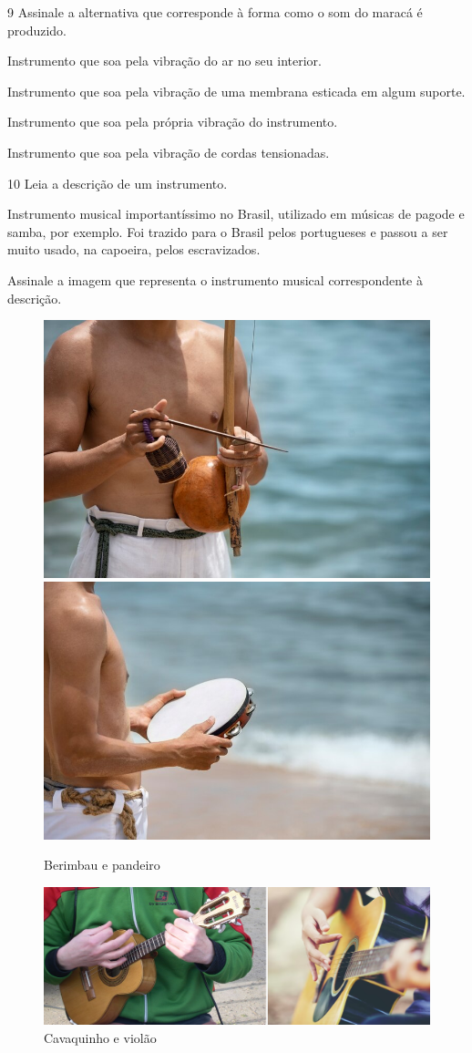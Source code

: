 \pagebreak
\num{9}  Assinale a alternativa que corresponde à forma como o som do maracá é produzido.

\begin{boxlist}
 Instrumento que soa pela vibração do ar no seu interior.

 Instrumento que soa pela vibração de uma membrana esticada em algum suporte.

 Instrumento que soa pela própria vibração do instrumento.

 Instrumento que soa pela vibração de cordas tensionadas.
\end{boxlist}


\num{10} Leia a descrição de um instrumento.

Instrumento musical importantíssimo no Brasil, utilizado em músicas
de pagode e samba, por exemplo. Foi trazido para o Brasil pelos portugueses
e passou a ser muito usado, na capoeira, pelos escravizados.

Assinale a imagem que representa o instrumento musical correspondente à descrição.
\enlargethispage{\baselineskip}

\begin{figure}[htpb!]
\includegraphics[width=.5\textwidth]{./imgs/art19a.jpg}
\includegraphics[width=.5\textwidth]{./imgs/art19b.jpg}
\caption{Berimbau e pandeiro}
\end{figure}

\begin{figure}[htpb!]
\acima{( ) \hfill( )}
\includegraphics[width=\textwidth]{./imgs/art19cd.png}
\caption{Cavaquinho e violão}
\end{figure}

